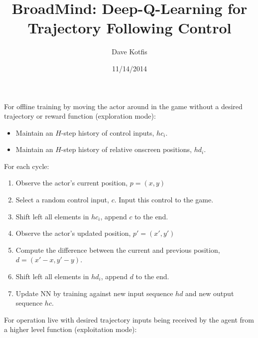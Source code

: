 \documentclass[11pt,english]{article}
\title{BroadMind: Deep-Q-Learning for Trajectory Following Control}
\author{Dave Kotfis}
\date{11/14/2014}
\begin{document}
\maketitle

For offline training by moving the actor around in the game without a desired trajectory or reward function (exploration mode):

\begin{itemize}

\item Maintain an $H$-step history of control inputs, $hc_i$.
\item Maintain an $H$-step history of relative onscreen positions, $hd_i$.

\end{itemize}

For each cycle:

\begin{enumerate}

\item Observe the actor's current position, $p = (x, y)$
\item Select a random control input, $c$. Input this control to the game.
\item Shift left all elements in $hc_i$, append $c$ to the end.
\item Observe the actor's updated position, $p' = (x', y')$
\item Compute the difference between the current and previous position, $d = (x'-x, y'-y)$.
\item Shift left all elements in $hd_i$, append $d$ to the end.
\item Update NN by training against new input sequence $hd$ and new output sequence $hc$.

\end{enumerate}

For operation live with desired trajectory inputs being received by the agent from a higher level function (exploitation mode):
\end{document}
